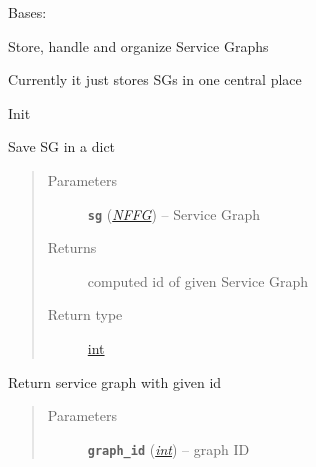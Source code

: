 \documentclass[letterpaper,10pt,english]{sphinxmanual}
\begin{document}

\begin{fulllineitems}
\label{service/sas_orchestration:escape.service.sas_orchestration.SGManager}
Bases: \href{https://docs.python.org/2.7/library/functions.html\#object}{}

Store, handle and organize Service Graphs

Currently it just stores SGs in one central place

\begin{fulllineitems}
\label{service/sas_orchestration:escape.service.sas_orchestration.SGManager.__init__}
Init

\end{fulllineitems}


\begin{fulllineitems}
\label{service/sas_orchestration:escape.service.sas_orchestration.SGManager.save}
Save SG in a dict
\begin{quote}\begin{description}
\item[{Parameters}] \leavevmode
\textbf{\texttt{sg}} ({\hyperref[util/nffg:escape.util.nffg.NFFG]{\emph{\emph{NFFG}}}}) -- Service Graph

\item[{Returns}] \leavevmode
computed id of given Service Graph

\item[{Return type}] \leavevmode
\href{https://docs.python.org/2.7/library/functions.html\#int}{int}

\end{description}\end{quote}

\end{fulllineitems}


\begin{fulllineitems}
\label{service/sas_orchestration:escape.service.sas_orchestration.SGManager.get}
Return service graph with given id
\begin{quote}\begin{description}
\item[{Parameters}] \leavevmode
\textbf{\texttt{graph\_id}} (\href{https://docs.python.org/2.7/library/functions.html\#int}{\emph{int}}) -- graph ID


\end{description}
\end{quote}
\end{fulllineitems}
\end{fulllineitems}
\end{document}
